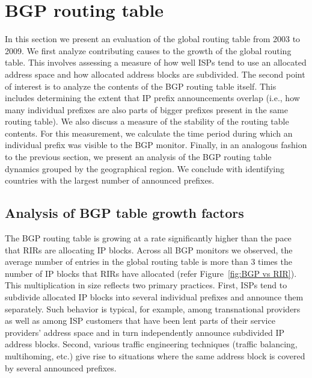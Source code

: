\section{BGP routing table}
\label{sec:bgp}

In this section we present an evaluation of the global routing table from 2003
to 2009. We first analyze contributing causes to the growth of the global
routing table. This involves assessing a measure of how well ISPs tend to use
an allocated address space and how allocated address blocks are subdivided. The
second point of interest is to analyze the contents of the BGP routing table
itself. This includes determining the extent that IP prefix announcements
overlap (i.e., how many individual prefixes are also parts of bigger prefixes
present in the same routing table). We also discuss a measure of the stability
of the routing table contents. For this measurement, we calculate the time
period during which an individual prefix was visible to the BGP monitor.
Finally, in an analogous fashion to the previous section, we present an
analysis of the BGP routing table dynamics grouped by the geographical region.
We conclude with identifying countries with the largest number of announced
prefixes.

\subsection{Analysis of BGP table growth factors}

The BGP routing table is growing at a rate significantly higher than the pace
that RIRs are allocating IP blocks. Across all BGP monitors we observed, the
average number of entries in the global routing table is more than 3 times the
number of IP blocks that RIRs have allocated (refer Figure~\ref{fig:BGP vs
RIR}). This multiplication in size reflects two primary practices. First, ISPs
tend to subdivide allocated IP blocks into several individual prefixes and
announce them separately. Such behavior is typical, for example, among
transnational providers as well as among ISP customers that have been lent
parts of their service providers' address space and in turn independently
announce subdivided IP address blocks. Second, various traffic engineering
techniques (traffic balancing, multihoming, etc.) give rise to situations where
the same address block is covered by several announced prefixes.


